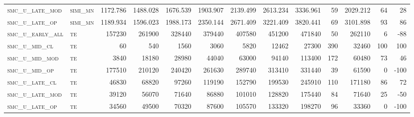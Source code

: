 \begin{landscape}
\begin{center}
\begin{footnotesize}
\begin{longtable}{llrrrrrrrr|rrr}
\textsc{smc\_u\_late\_mod } & \textsc{simi\_mn  }   & 1172.786 & 1488.028 & 1676.539 & 1903.907 & 2139.499 & 2613.234 & 3336.961  & 59     & 2029.212      & 64            & 28              \\
\textsc{smc\_u\_late\_op  } & \textsc{simi\_mn  }   & 1189.934 & 1596.023 & 1988.173 & 2350.144 & 2671.409 & 3221.409 & 3820.441  & 69     & 3101.898      & 93            & 86              \\
\textsc{smc\_u\_early\_all} & \textsc{te  	    }   & 157230   & 261900   & 328440   & 379440   & 407580   & 451200   & 471840    & 50     & 262110        & 6             & -88             \\
\textsc{smc\_u\_mid\_cl   } & \textsc{te        }   & 60       & 540      & 1560     & 3060     & 5820     & 12462    & 27300     & 390    & 32460         & 100           & 100             \\
\textsc{smc\_u\_mid\_mod  } & \textsc{te        }   & 3840     & 18180    & 28980    & 44040    & 63000    & 94140    & 113400    & 172    & 60480         & 73            & 46              \\
\textsc{smc\_u\_mid\_op   } & \textsc{te        }   & 177510   & 210120   & 240420   & 261630   & 289740   & 313410   & 331440    & 39     & 61590         & 0             & -100            \\
\textsc{smc\_u\_late\_cl  } & \textsc{te        }   & 46830    & 68820    & 97260    & 119190   & 152790   & 199530   & 245910    & 110    & 171180        & 86            & 72              \\
\textsc{smc\_u\_late\_mod } & \textsc{te        }   & 39120    & 56070    & 71640    & 86880    & 101010   & 128820   & 175440    & 84     & 71640         & 25            & -50             \\
\textsc{smc\_u\_late\_op  } & \textsc{te        }   & 34560    & 49500    & 70320    & 87600    & 105570   & 133320   & 198270    & 96     & 33360         & 0             & -100           


\end{longtable}
\end{footnotesize}
\end{center}
\end{landscape}

\restoregeometry
\pagestyle{headings}


